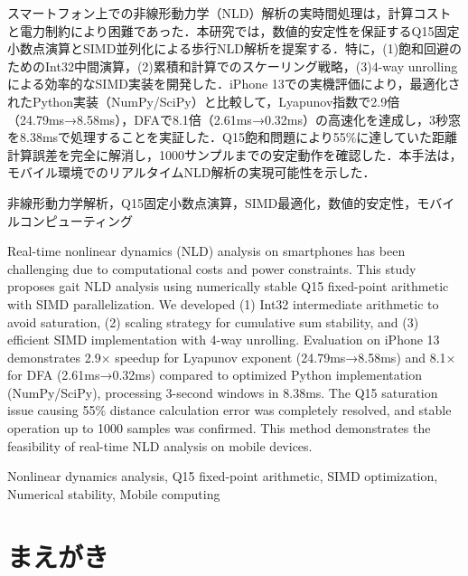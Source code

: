 \documentclass[paper]{ieice}
\begin{document}
\begin{jabstract}
スマートフォン上での非線形動力学（NLD）解析の実時間処理は，計算コストと電力制約により困難であった．本研究では，数値的安定性を保証するQ15固定小数点演算とSIMD並列化による歩行NLD解析を提案する．特に，(1)飽和回避のためのInt32中間演算，(2)累積和計算でのスケーリング戦略，(3)4-way unrollingによる効率的なSIMD実装を開発した．iPhone 13での実機評価により，最適化されたPython実装（NumPy/SciPy）と比較して，Lyapunov指数で2.9倍（24.79ms→8.58ms），DFAで8.1倍（2.61ms→0.32ms）の高速化を達成し，3秒窓を8.38msで処理することを実証した．Q15飽和問題により55\%に達していた距離計算誤差を完全に解消し，1000サンプルまでの安定動作を確認した．本手法は，モバイル環境でのリアルタイムNLD解析の実現可能性を示した．
\end{jabstract}

\begin{jkeyword}
非線形動力学解析，Q15固定小数点演算，SIMD最適化，数値的安定性，モバイルコンピューティング
\end{jkeyword}

\begin{eabstract}
Real-time nonlinear dynamics (NLD) analysis on smartphones has been challenging due to computational costs and power constraints. This study proposes gait NLD analysis using numerically stable Q15 fixed-point arithmetic with SIMD parallelization. We developed (1) Int32 intermediate arithmetic to avoid saturation, (2) scaling strategy for cumulative sum stability, and (3) efficient SIMD implementation with 4-way unrolling. Evaluation on iPhone 13 demonstrates 2.9× speedup for Lyapunov exponent (24.79ms→8.58ms) and 8.1× for DFA (2.61ms→0.32ms) compared to optimized Python implementation (NumPy/SciPy), processing 3-second windows in 8.38ms. The Q15 saturation issue causing 55\% distance calculation error was completely resolved, and stable operation up to 1000 samples was confirmed. This method demonstrates the feasibility of real-time NLD analysis on mobile devices.
\end{eabstract}

\begin{ekeyword}
Nonlinear dynamics analysis, Q15 fixed-point arithmetic, SIMD optimization, Numerical stability, Mobile computing
\end{ekeyword}

\maketitle

\section{まえがき}
\end{document}
